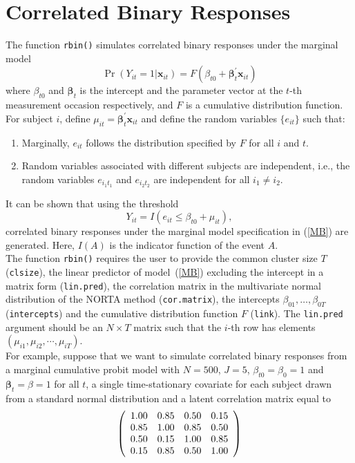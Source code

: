 \documentclass{article}
\begin{document}
\section{Correlated Binary Responses}
The function \texttt{rbin()} simulates correlated binary responses under the marginal model
\begin{equation}
\Pr(Y_{it}=1 |\mathbf {x}_{it})=F(\beta_{t0} +\boldsymbol {\beta}^{\prime}_{t} \mathbf {x}_{it})
\label{MB}
\end{equation}
where $\beta_{t0}$ and $\boldsymbol \beta_t$ is the intercept and the parameter vector at the $t$-th measurement occasion respectively, and $F$ is a cumulative distribution function.\\
For subject $i$, define $\mu_{it}=\boldsymbol{\beta}^{\prime}_t \mathbf {x}_{it}$ and define the random variables $\{e_{it}\}$ such that:
\begin{enumerate}
\item Marginally, $e_{it}$ follows the distribution specified by $F$ for all $i$ and $t$.
\item Random variables associated with different subjects are independent, i.e., the random variables $e_{i_1t_1}$ and $e_{i_2t_2}$ are independent for all $i_1 \neq i_2$.
\end{enumerate}
It can be shown that using the threshold
$$Y_{it}=I(e_{it} \leq \beta_{t0}+\mu_{it}),$$
correlated binary responses under the marginal model specification in (\ref{MB}) are generated. Here, $I(A)$ is the indicator function of the event $A$.\\
\indent The function \texttt{rbin()} requires the user to provide the common cluster size $T$ (\texttt{clsize}), the linear predictor of model~(\ref{MB}) excluding the intercept in a matrix form (\texttt{lin.pred}), the correlation matrix in the multivariate normal distribution of the NORTA method (\texttt{cor.matrix}), the intercepts $\beta_{01},\ldots, \beta_{0T}$ (\texttt{intercepts}) and the cumulative distribution function $F$ (\texttt{link}). The \texttt{lin.pred} argument should be an $N \times T$ matrix such that the $i$-th row has elements $(\mu_{i1},\mu_{i2},\cdots,\mu_{iT})$.\\
\indent For example, suppose that we want to simulate correlated binary responses from a marginal cumulative probit model with $N=500$, $J=5$, $\beta_{t0}=\beta_{0}=1$ and $\boldsymbol \beta_t=\beta=1$ for all $t$, a single time-stationary covariate for each subject drawn from a standard normal distribution and a latent correlation matrix equal to
$$\left( {\begin{array}{*{20}c}
   1.00 & 0.85 & 0.50 & 0.15  \\
   0.85 & 1.00 & 0.85 & 0.50  \\
   0.50 & 0.15 & 1.00 & 0.85 \\
   0.15 & 0.85 & 0.50 & 1.00
 \end{array} } \right)$$
\end{document}
